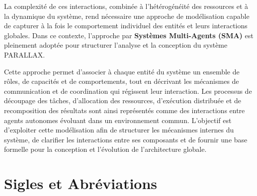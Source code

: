 \documentclass[12pt,a4paper]{report}
\begin{document}
La complexité de ces interactions, combinée à l'hétérogénéité des ressources et à la dynamique du système, rend nécessaire une approche de modélisation capable de capturer à la fois le comportement individuel des entités et leurs interactions globales. Dans ce contexte, l'approche par \textbf{Systèmes Multi-Agents (SMA)} est pleinement adoptée pour structurer l'analyse et la conception du système PARALLAX.

Cette approche permet d'associer à chaque entité du système un ensemble de rôles, de capacités et de comportements, tout en décrivant les mécanismes de communication et de coordination qui régissent leur interaction. Les processus de découpage des tâches, d'allocation des ressources, d'exécution distribuée et de recomposition des résultats sont ainsi représentés comme des interactions entre agents autonomes évoluant dans un environnement commun. L'objectif est d'exploiter cette modélisation afin de structurer les mécanismes internes du système, de clarifier les interactions entre ses composants et de fournir une base formelle pour la conception et l'évolution de l'architecture globale.

\chapter*{Sigles et Abréviations}
\end{document}
